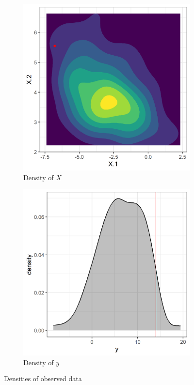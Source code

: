 \documentclass{article}
\begin{document}
\begin{figure}
	\centering
	\begin{subfigure}{0.5\linewidth}
		\centering \includegraphics[width=\linewidth]{../examples/lm-normal-fixed/images/density-X.png}
		\caption{Density of $X$}
		\label{fig:lm-normal-X}
	\end{subfigure}%
	\begin{subfigure}{0.5\linewidth}
		\centering \includegraphics[width=\linewidth]{../examples/lm-normal-fixed/images/density-y.png}
		\caption{Density of $y$}
		\label{fig:lm-normal-y}
	\end{subfigure}
	\caption{Densities of observed data}
	\label{fig:lm-normal-densities}
\end{figure}
\end{document}
